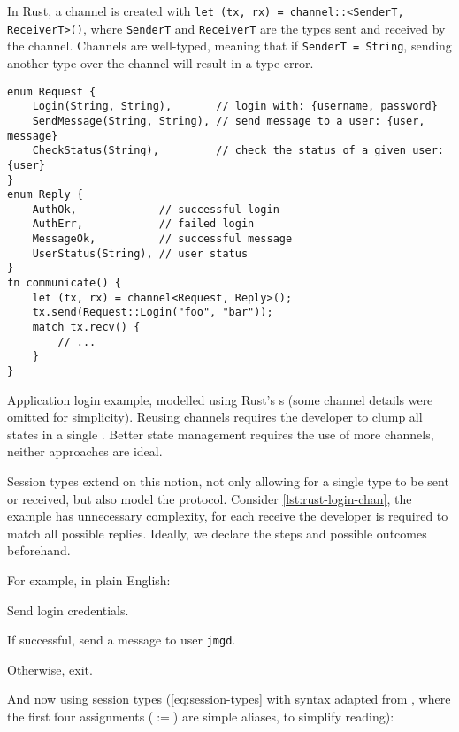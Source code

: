 In Rust, a channel is created with \texttt{let (tx, rx) = channel::<SenderT, ReceiverT>()},
where \texttt{SenderT} and \texttt{ReceiverT} are the types sent and received by the channel.
Channels are well-typed, meaning that if \texttt{SenderT = String},
sending another type over the channel will result in a type error.

\begin{listing}
    \centering
    \begin{verbatim}
enum Request {
    Login(String, String),       // login with: {username, password}
    SendMessage(String, String), // send message to a user: {user, message}
    CheckStatus(String),         // check the status of a given user: {user}
}
enum Reply {
    AuthOk,             // successful login
    AuthErr,            // failed login
    MessageOk,          // successful message
    UserStatus(String), // user status
}
fn communicate() {
    let (tx, rx) = channel<Request, Reply>();
    tx.send(Request::Login("foo", "bar"));
    match tx.recv() {
        // ...
    }
}
    \end{verbatim}
    \caption{
        Application login example, modelled using Rust's s
        (some channel details were omitted for simplicity).
        Reusing channels requires the developer to clump all states in a single .
        Better state management requires the use of more channels, neither approaches are ideal.
    }
    \label{lst:rust-login-chan}
\end{listing}

Session types extend on this notion, not only allowing for a single type to be sent or received,
but also model the protocol.
Consider \autoref{lst:rust-login-chan}, the example has unnecessary complexity,
for each receive the developer is required to match all possible replies.
Ideally, we declare the steps and possible outcomes beforehand.

For example, in plain English:
\begin{compactenum}
    \item Send login credentials.
    \item If successful, send a message to user \texttt{jmgd}.
    \item Otherwise, exit.
\end{compactenum}

And now using session types (\autoref{eq:session-types}
with syntax adapted from \autocite{Vasconcelos2006},
where the first four assignments ($:=$) are simple aliases, to simplify reading):

